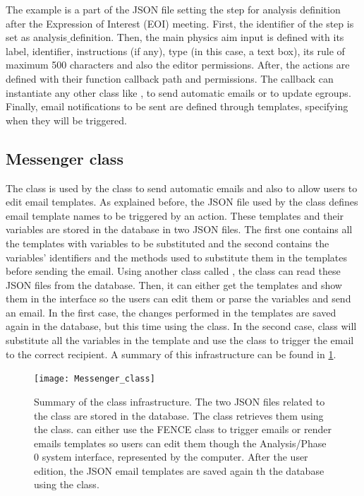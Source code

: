 The example is a part of the JSON file setting the step for analysis definition
after the Expression of Interest (EOI) meeting.
First, the identifier of the step is set as analysis$\_$definition.
Then, the main physics aim input is defined with its label, identifier, instructions (if any), type (in this case, a text box), its rule of maximum 500 characters and also the editor permissions. After, the actions are defined with their function callback path and permissions.
The callback can instantiate any other class like , to send automatic emails or  to update egroups.
Finally, email notifications to be sent are defined through templates, specifying when they will be triggered.

\subsection{Messenger class}%
\label{sec:Messenger_class}

The  class is used by the  class to send automatic emails and also to allow users to edit email templates. As explained before, the JSON file used by the  class defines email template names to be triggered by an action.
These templates and their variables are stored in the database in two JSON files.
The first one contains all the templates with variables to be substituted and the second contains the variables' identifiers and the methods used to substitute them in the templates before sending the email.
Using another class called , the  class can read these JSON files from the database.
Then, it can either get the templates and show them in the interface so the users can edit them or parse the variables and send an email.
In the first case, the changes performed in the templates are saved again in the database, but this time using the  class.
In the second case,  class will substitute all the variables in the template and use the  class to trigger the email to the correct recipient.
A summary of this infrastructure can be found in \cref{fig:Messenger_class}.

\begin{figure}[htb]
  \centering
  \texttt{[image: Messenger\_class]}
  \caption{Summary of the  class infrastructure. The two JSON files related to the  class are stored in the database. The class retrieves them using the  class.  can either use the FENCE  class to trigger emails or render emails templates so users can edit them though the Analysis/Phase 0 system interface, represented by the computer. After the user edition, the JSON email templates are saved again th the database using the  class.}%
  \label{fig:Messenger_class}
\end{figure}

